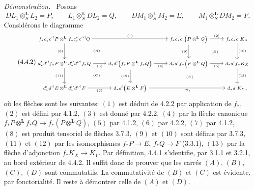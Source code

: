 \documentclass[11pt]{article}
\newenvironment{prooftext}[1][Proof]{\par\noindent\emph{#1.}\ }{\par\medskip}
\begin{document}
\begin{prooftext}[Démonstration]
Posons
\[
DL_1\otimes_S^{\mathbf L}L_2=P,\qquad
L_1\otimes_S^{\mathbf L}DL_2=Q,\qquad
DM_1\otimes_S^{\mathbf L}M_2=E,\qquad
M_1\otimes_S^{\mathbf L}DM_2=F.
\]
Considérons le diagramme
\begin{equation}
\tag{4.4.2}
{\scriptsize
\begin{tikzcd}[column sep=2.6em,row sep=2.6em]
f_*c'_*c'{}^!P\otimes^{\mathbf L} f_*c''_*c''{}^!Q
  \arrow[rr,"(1)"] \arrow[d,"(8)"'] &&
f_*c_*c^!\bigl(P\otimes^{\mathbf L}Q\bigr)
  \arrow[r,"(2)"] \arrow[d,"(9)"'] &
f_*c_*c^!K_X \arrow[d,"(10)"]\\
d'_*d'{}^!f_*P\otimes^{\mathbf L}d''_*d''{}^!f_*Q
  \arrow[r,"(3)"'] \arrow[d,"(11)"'] &
d_*d^!\bigl(f_*P\otimes^{\mathbf L}f_*Q\bigr)
  \arrow[r,"(4)"'] \arrow[d,"(12)"'] &
d_*d^!f_*\bigl(P\otimes^{\mathbf L}Q\bigr)
  \arrow[r,"(5)"'] &
d_*d^!f_*K_X \arrow[d,"(13)"]\\
d'_*d'{}^!E\otimes^{\mathbf L}d''_*d''{}^!F
  \arrow[r,"(6)"'] &
d_*d^!\bigl(E\otimes^{\mathbf L}F\bigr)
  \arrow[rr,"(7)"'] &&
d_*d^!K_Y,
\arrow[from=1-1,to=2-2, phantom, "\scriptstyle (A)"]
\arrow[from=1-3,to=2-4, phantom, "\scriptstyle (B)"]
\arrow[from=2-1,to=3-2, phantom, "\scriptstyle (C)"]
\arrow[from=2-2,to=3-4, phantom, "\scriptstyle (D)"]
\end{tikzcd}
}
\end{equation}
où les flèches sont les suivantes: $(1)$ est déduit de 4.2.2 par application de $f_*$, $(2)$ est défini par 4.1.2, $(3)$ est donné par 4.2.2, $(4)$ par la flèche canonique $f_*P\otimes^{\mathbf L}f_*Q\longrightarrow f_*(P\otimes^{\mathbf L}Q)$, $(5)$ par 4.1.2, $(6)$ par 4.2.2, $(7)$ par 4.1.2, $(8)$ est produit tensoriel de flèches 3.7.3, $(9)$ et $(10)$ sont définis par 3.7.3, $(11)$ et $(12)$ par les isomorphismes $f_*P\longrightarrow E$, $f_*Q\longrightarrow F$ (3.3.1), $(13)$ par la flèche d'adjonction $f_*K_X\longrightarrow K_Y$. Par définition, 4.4.1 s'identifie, par 3.1.1 et 3.2.1, au bord extérieur de 4.4.2. Il suffit donc de prouver que les carrés $(A)$, $(B)$, $(C)$, $(D)$ sont commutatifs. La commutativité de $(B)$ et $(C)$ est évidente, par fonctorialité. Il reste à démontrer celle de $(A)$ et $(D)$.


\end{prooftext}
\end{document}
